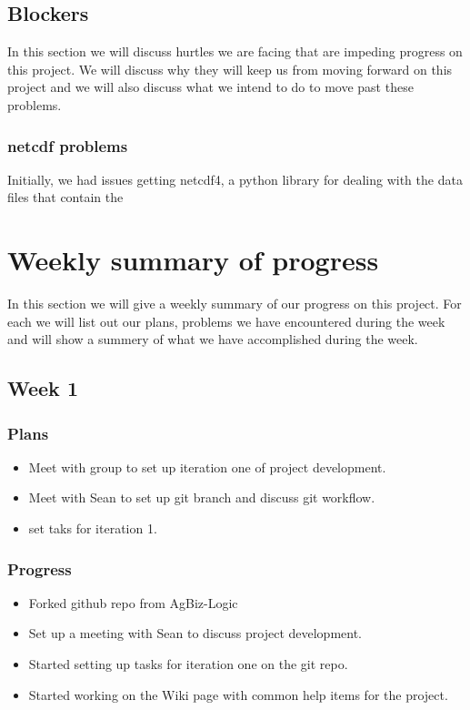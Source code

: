 \documentclass[onecolumn, draftclsnofoot,10pt, compsoc]{article}
\begin{document}
	\subsection{Blockers}
	    In this section we will discuss hurtles we are facing that are impeding progress on this project. We will discuss why they will keep us from moving forward on this project and we will also discuss what we intend to do to move past these problems.\\
			
			\subsubsection{netcdf problems}
			Initially, we had issues getting netcdf4, a python library for dealing with the data files that contain the 
	
\section{Weekly summary of progress}
	   In this section we will give a weekly summary of our progress on this project. For each we will list out our plans, problems we have encountered during the week and will show a summery of what we have accomplished during the week.\\
			
		\subsection{Week 1}
			\subsubsection{Plans}
				\begin{itemize}
					\item Meet with group to set up iteration one of project development.
					\item Meet with Sean to set up git branch and discuss git workflow.
					\item set taks for iteration 1.
				\end{itemize}
			
			\subsubsection{Progress}
				\begin{itemize}
					\item Forked github repo from AgBiz-Logic
					\item Set up a meeting with Sean to discuss project development.
					\item Started setting up tasks for iteration one on the git repo.
					\item Started working on the Wiki page with common help items for the project.
				\end{itemize}
\end{document}
